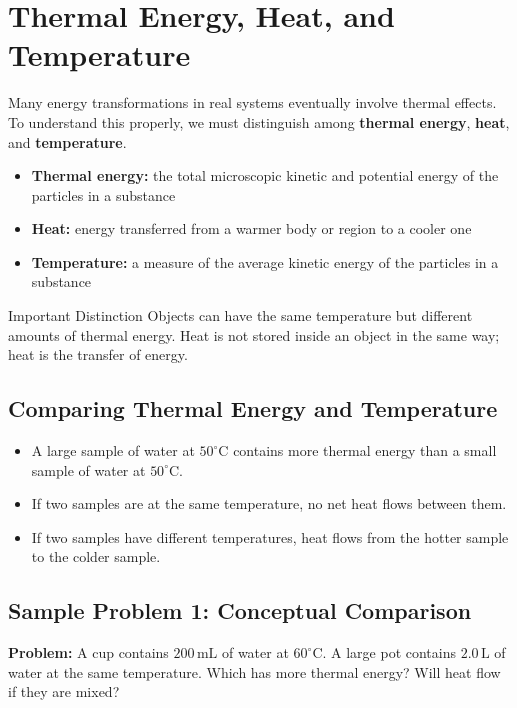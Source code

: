 



\maketitle

\section{Thermal Energy, Heat, and Temperature}
Many energy transformations in real systems eventually involve thermal effects. To understand this properly, we must distinguish among \textbf{thermal energy}, \textbf{heat}, and \textbf{temperature}.

\begin{itemize}
    \item \textbf{Thermal energy:} the total microscopic kinetic and potential energy of the particles in a substance
    \item \textbf{Heat:} energy transferred from a warmer body or region to a cooler one
    \item \textbf{Temperature:} a measure of the average kinetic energy of the particles in a substance
\end{itemize}

\begin{keyidea}{Important Distinction}
Objects can have the same temperature but different amounts of thermal energy. Heat is not stored inside an object in the same way; heat is the transfer of energy.
\end{keyidea}

\subsection{Comparing Thermal Energy and Temperature}
\begin{itemize}
    \item A large sample of water at $50^\circ \text{C}$ contains more thermal energy than a small sample of water at $50^\circ \text{C}$.
    \item If two samples are at the same temperature, no net heat flows between them.
    \item If two samples have different temperatures, heat flows from the hotter sample to the colder sample.
\end{itemize}

\subsection*{Sample Problem 1: Conceptual Comparison}
\textbf{Problem:} A cup contains $200\,\text{mL}$ of water at $60^\circ \text{C}$. A large pot contains $2.0\,\text{L}$ of water at the same temperature. Which has more thermal energy? Will heat flow if they are mixed?

